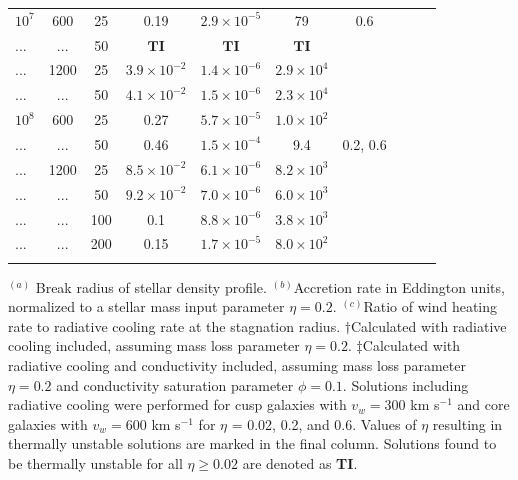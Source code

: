 \documentclass[usenatbib,fleqn]{mn2e}
\begin{document}
\begin{table}
\begin{threeparttable}
\begin{minipage}{18cm}
\begin{tabular}{lccccccccc}
$    10^{ 7 }$ & 600 & 25 & 0.19 & $ 2.9 \times 10^{ -5 }$ & 79 & 0.6 \\
... & ... & 50 & $\mathbf{TI}$ & $\mathbf{TI}$ & $\mathbf{TI}$ \\
... & 1200 & 25 & $ 3.9 \times 10^{ -2 }$ & $ 1.4 \times 10^{ -6 }$ & $ 2.9 \times 10^{ 4 }$ \\
 ... & ... & 50 & $ 4.1 \times 10^{ -2 }$ & $ 1.5 \times 10^{ -6 }$ & $ 2.3 \times 10^{ 4 }$ \\
$    10^{ 8 }$ & 600 & 25 & 0.27 & $ 5.7 \times 10^{ -5 }$ & $ 1.0 \times 10^{ 2 }$ \\
... & ... & 50 & 0.46 & $ 1.5 \times 10^{ -4 }$ & 9.4 & 0.2, 0.6\\
... & 1200 & 25 & $ 8.5 \times 10^{ -2 }$ & $ 6.1 \times 10^{ -6 }$ & $ 8.2 \times 10^{ 3 }$ \\
... & ... & 50 & $ 9.2 \times 10^{ -2 }$ & $ 7.0 \times 10^{ -6 }$ & $ 6.0 \times 10^{ 3 }$ \\
... & ... & 100 & 0.1 & $ 8.8 \times 10^{ -6 }$ & $ 3.8 \times 10^{ 3 }$ \\
... & ... & 200 & 0.15 & $ 1.7 \times 10^{ -5 }$ & $ 8.0 \times 10^{ 2 }$ \\
\hline
\label{table:models}  
\end{tabular}
\begin{tablenotes}
\item $^{(a)}$ Break radius of stellar density profile.  $^{(b)}$Accretion
  rate in Eddington units, normalized to a stellar mass input
  parameter $\eta = 0.2$.  $^{(c)}$Ratio of wind heating rate to
  radiative cooling rate at the stagnation radius. $\dagger$Calculated with
  radiative cooling included, assuming mass loss parameter $\eta =
  0.2$.  $\ddagger$Calculated with radiative cooling and conductivity
  included, assuming mass loss parameter $\eta = 0.2$ and conductivity
  saturation parameter $\phi = 0.1$.  Solutions including radiative cooling were performed for cusp galaxies with $v_w=300 $ km s$^{-1}$ and core galaxies with $v_w=600 $ km s$^{-1}$ for $\eta$ = 0.02, 0.2, and 0.6.  Values of $\eta$ resulting in thermally unstable solutions are marked in the final column.  Solutions found to be thermally unstable for all $\eta
  \geq 0.02$ are denoted as {\bf TI}.
\end{tablenotes}
\end{minipage}
\end{threeparttable}

\end{table}
\end{document}
